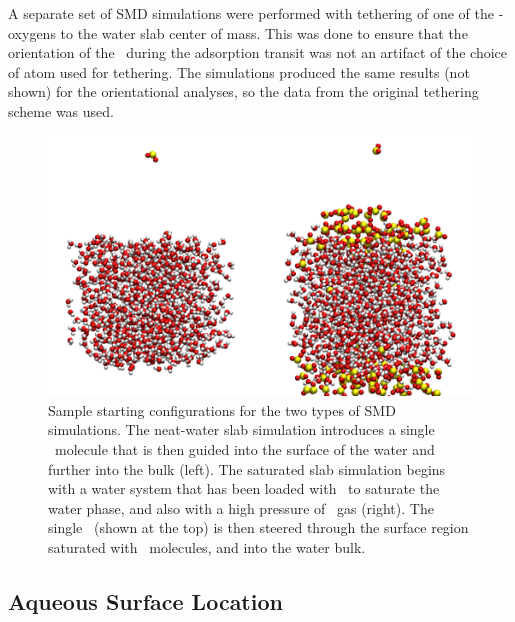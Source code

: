 A separate set of SMD simulations were performed with tethering of one of the \suldiox-oxygens to the water slab center of mass. This was done to ensure that the orientation of the \suldiox~during the adsorption transit was not an artifact of the choice of atom used for tethering. The simulations produced the same results (not shown) for the orientational analyses, so the data from the original tethering scheme was used.

\begin{figure}[h!]
	\begin{center}
		\includegraphics[scale=1.0]{images/startingconfigurations.png}
		\caption{Sample starting configurations for the two types of SMD simulations. The neat-water slab simulation introduces a single \suldiox~molecule that is then guided into the surface of the water and further into the bulk (left). The saturated slab simulation begins with a water system that has been loaded with \suldiox~to saturate the water phase, and also with a high pressure of \suldiox~gas (right). The single \suldiox~(shown at the top) is then steered through the surface region saturated with \suldiox~molecules, and into the water bulk.}
		\label{fig:starting-configurations}
	\end{center}
\end{figure}

\subsection {Aqueous Surface Location}

